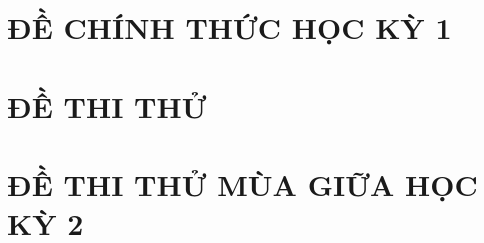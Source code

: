 \documentclass[12pt,a4paper,oneside]{book}
\begin{document}
\chapter{ĐỀ CHÍNH THỨC HỌC KỲ 1}

\newpage
\newpage
\newpage
\newpage
\newpage
\newpage
\newpage
\newpage
\newpage
\newpage
\newpage
\newpage
\newpage
\newpage
\newpage
\newpage
\newpage
\newpage
\newpage
\newpage
\newpage
\newpage
\newpage
\newpage
\chapter{ĐỀ THI THỬ}

\newpage
\newpage
\newpage
\chapter{ĐỀ THI THỬ MÙA GIỮA HỌC KỲ 2}

\newpage
\newpage
\newpage
\newpage
\newpage
\newpage
\end{document}
